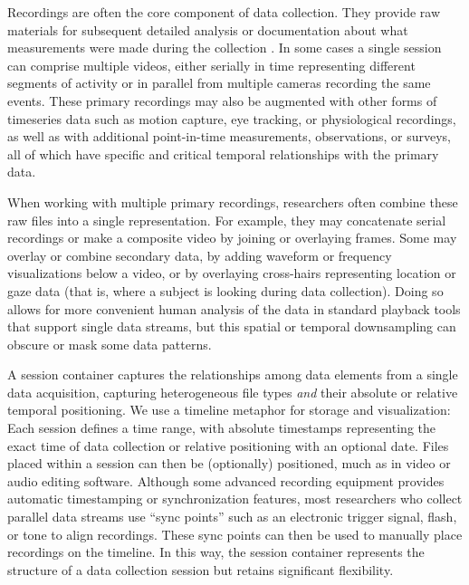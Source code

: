 \documentclass{sig-alternate}
\begin{document}
Recordings are often the core component of data collection.
They provide raw materials for subsequent detailed analysis or documentation about what measurements were made during the collection \cite{Bakeman_2012}.
In some cases a single session can comprise multiple videos, either serially in time representing different segments of activity or in parallel from multiple cameras recording the same events.
These primary recordings may also be augmented with other forms of timeseries data such as motion capture, eye tracking, or physiological recordings, as well as with additional point-in-time measurements, observations, or surveys, all of which have specific and critical temporal relationships with the primary data.

When working with multiple primary recordings, researchers often combine these raw files into a single representation.
For example, they may concatenate serial recordings or make a composite video by joining or overlaying frames.
Some may overlay or combine secondary data, by adding waveform or frequency visualizations below a video, or by overlaying cross-hairs representing location or gaze data (that is, where a subject is looking during data collection).
Doing so allows for more convenient human analysis of the data in standard playback tools that support single data streams, but this spatial or temporal downsampling can obscure or mask some data patterns.

A session container captures the relationships among data elements from a single data acquisition, capturing heterogeneous file types \emph{and} their absolute or relative temporal positioning.
We use a timeline metaphor for storage and visualization: Each session defines a time range, with absolute timestamps representing the exact time of data collection or relative positioning with an optional date.
Files placed within a session can then be (optionally) positioned, much as in video or audio editing software.
Although some advanced recording equipment provides automatic timestamping or synchronization features, most researchers who collect parallel data streams use ``sync points'' such as an electronic trigger signal, flash, or tone to align recordings.
These sync points can then be used to manually place recordings on the timeline.
In this way, the session container represents the structure of a data collection session but retains significant flexibility.
\end{document}
